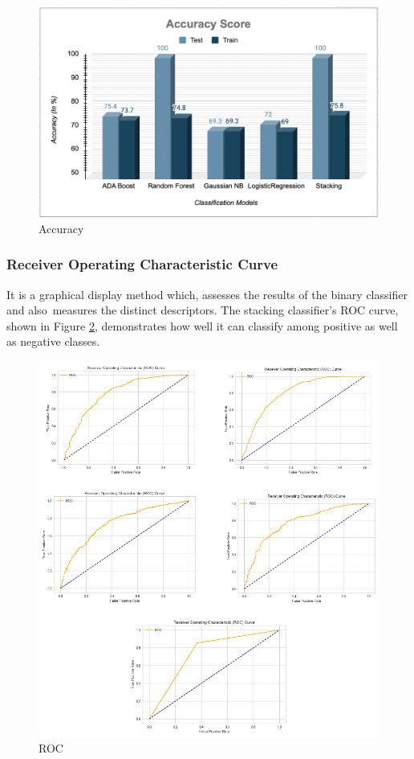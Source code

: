 \documentclass[10pt]{article}
\begin{document}
\begin{figure}[H]
    \begin{center}
        \includegraphics[width=0.7\linewidth,frame]{CA2-template/RIC15.png}
       \caption{Accuracy \label{fig:13}}
    \end{center}
\end{figure}

\subsubsection{Receiver Operating Characteristic Curve}
It is a graphical display method which, assesses the results of the binary classifier and also measures the distinct descriptors. 
The stacking classifier's ROC curve, shown in Figure \ref{fig:15}, demonstrates how well it can classify among positive as well as negative classes.
\begin{figure}[H]
    \begin{center}
        \includegraphics[width=0.7\linewidth,frame]{CA2-template/RIC17.png}
       \caption{ROC \label{fig:15}}
    \end{center}
\end{figure}
\end{document}
